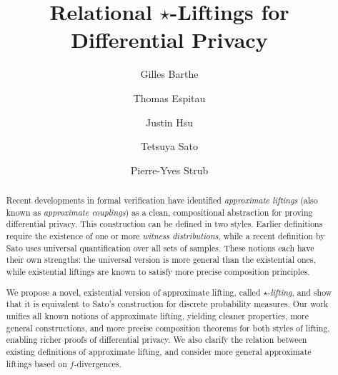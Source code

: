 \documentclass{lmcs}
\begin{document}
\title{Relational \texorpdfstring{$\star$-Liftings}{*-Liftings} for Differential Privacy}

\author[G. Barthe]{Gilles Barthe}
\address{IMDEA Software Institute, Spain and MPI for Security and Privacy, Germany}

\author[T. Espitau]{Thomas Espitau}
\address{Sorbonne Universités, UPMC Paris 6, France}

\author[J. Hsu]{Justin Hsu}
\address{University of Wisconsin--Madison, USA}

\author[T. Sato]{Tetsuya Sato}
\address{Seikei University, Japan}

\author[P.-Y. Strub]{Pierre-Yves Strub}
\address{École Polytechnique, France}

\begin{abstract}
  Recent developments in formal verification have identified \emph{approximate
    liftings} (also known as \emph{approximate couplings}) as a clean,
  compositional abstraction for proving differential privacy. This construction
  can be defined in two styles. Earlier definitions require the
  existence of one or more \emph{witness distributions}, while a recent definition by
  Sato uses universal quantification over all sets of samples. These notions
  each have their own strengths: the universal version is more general
  than the existential ones, while existential liftings are known to satisfy
  more precise composition principles.  

  We propose a novel, existential version of approximate lifting, called
  $\star$-\emph{lifting}, and show that it is equivalent to Sato's construction
  for discrete probability measures. Our work unifies all known notions of
  approximate lifting, yielding cleaner properties, more general constructions,
  and more precise composition theorems for both styles of lifting, enabling
  richer proofs of differential privacy. We also clarify the relation between
  existing definitions of approximate lifting, and consider more general
  approximate liftings based on $f$-divergences.
\end{abstract}

\maketitle
\end{document}
